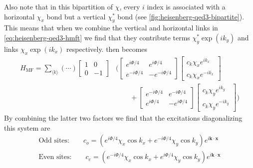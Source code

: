 \documentclass{report}
\begin{document}
Also note that in this bipartition of $ \chi $, every $ i $ index is associated 
with a horizontal $\chi_x $ bond but a vertical $ \chi_y^\ast $ bond (see 
\cref{fig:heisenberg-qed3-bipartite}). This means that when we combine the 
vertical and horizontal links in \cref{eq:heisenberg-qed3-hmft} we find that they
contribute terms $ \chi_{y}^\ast \exp(ik_y) $ and links $ \chi_x \exp(ik_x) $
respectively.  then becomes 
\begin{align*}
	H_{\text{MF}}
		= \sum_{\langle k \rangle}
		(\cdots)
			\begin{bmatrix}
				1 & 0 \\ 0 & -1
			\end{bmatrix}&
			\bigg(
				\begin{bmatrix}
				e^{i\Phi/4} & e^{i\Phi/4}\\ 
				e^{-i\Phi/4} & - e^{-i\Phi/4}
				\end{bmatrix}
				\begin{bmatrix}
					c_k \chi_x
					e^{ik_x}\\
					c_k\chi_x
					e^{-ik_x}
				\end{bmatrix}\\
				&\qquad 
				+ 
				\begin{bmatrix}
				e^{-i\Phi/4} & e^{-i\Phi/4}\\ 
				e^{i\Phi/4} & -e^{i\Phi/4}
				\end{bmatrix}
				\begin{bmatrix}
					c_k \chi_y
					e^{ik_y} \\
					c_k \chi_y
					e^{-ik_y}
				\end{bmatrix}
			\bigg)
\end{align*}
By combining the latter two factors we find that the excitations diagonalizing 
this system are 
\begin{align*}
	\text{Odd sites:} \qquad c_o = \left(e^{i\Phi/4}\chi_x \cos k_x + e^{-i\Phi/4} \chi_y \cos k_y \right)
		e^{i \mathbf{k}\cdot \mathbf{x}}\\
	\text{Even sites:} \qquad c_e = \left(e^{-i\Phi/4}\chi_x \cos k_x + e^{i\Phi/4} \chi_y \cos k_y \right)
		e^{i \mathbf{k}\cdot \mathbf{x}}
\end{align*}
\end{document}
